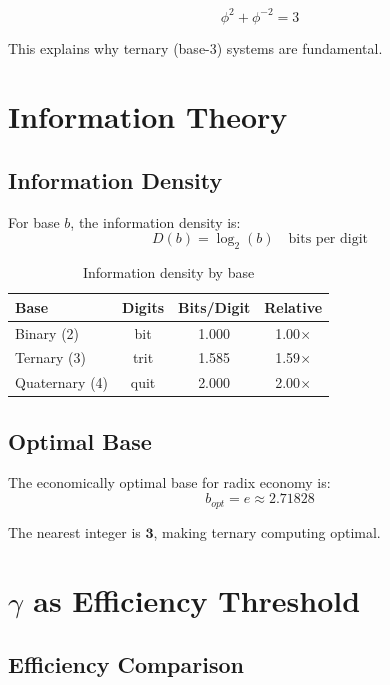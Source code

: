 \documentclass[12pt,a4paper]{article}
\begin{document}
\begin{equation}
\phi^2 + \phi^{-2} = 3
\end{equation}

This explains why ternary (base-3) systems are fundamental.

\section{Information Theory}

\subsection{Information Density}

For base $b$, the information density is:
\begin{equation}
D(b) = \log_2(b) \quad \text{bits per digit}
\end{equation}

\begin{table}[h]
\centering
\begin{tabular}{lccc}
\toprule
Base & Digits & Bits/Digit & Relative \\
\midrule
Binary (2) & bit & 1.000 & 1.00$\times$ \\
Ternary (3) & trit & 1.585 & 1.59$\times$ \\
Quaternary (4) & quit & 2.000 & 2.00$\times$ \\
\bottomrule
\end{tabular}
\caption{Information density by base}
\end{table}

\subsection{Optimal Base}

The economically optimal base for radix economy is:
\begin{equation}
b_{opt} = e \approx 2.71828
\end{equation}

The nearest integer is $\mathbf{3}$, making ternary computing optimal.

\section{$\gamma$ as Efficiency Threshold}

\subsection{Efficiency Comparison}
\end{document}
